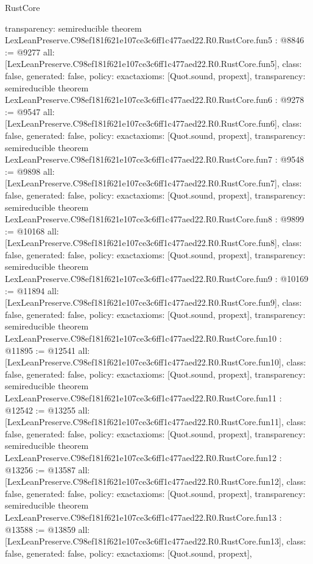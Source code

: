 \begin{lexlean}{RustCore}
\begin{coremodule}
{  transparency: semireducible
}
theorem LexLeanPreserve.C98ef181f621e107ce3c6ff1c477aed22.R0.RustCore.fun5 : @8846 := @9277 {
  all: [LexLeanPreserve.C98ef181f621e107ce3c6ff1c477aed22.R0.RustCore.fun5],
  class: false,
  generated: false,
  policy: exact{axioms: [Quot.sound, propext]},
  transparency: semireducible
}
theorem LexLeanPreserve.C98ef181f621e107ce3c6ff1c477aed22.R0.RustCore.fun6 : @9278 := @9547 {
  all: [LexLeanPreserve.C98ef181f621e107ce3c6ff1c477aed22.R0.RustCore.fun6],
  class: false,
  generated: false,
  policy: exact{axioms: [Quot.sound, propext]},
  transparency: semireducible
}
theorem LexLeanPreserve.C98ef181f621e107ce3c6ff1c477aed22.R0.RustCore.fun7 : @9548 := @9898 {
  all: [LexLeanPreserve.C98ef181f621e107ce3c6ff1c477aed22.R0.RustCore.fun7],
  class: false,
  generated: false,
  policy: exact{axioms: [Quot.sound, propext]},
  transparency: semireducible
}
theorem LexLeanPreserve.C98ef181f621e107ce3c6ff1c477aed22.R0.RustCore.fun8 : @9899 := @10168 {
  all: [LexLeanPreserve.C98ef181f621e107ce3c6ff1c477aed22.R0.RustCore.fun8],
  class: false,
  generated: false,
  policy: exact{axioms: [Quot.sound, propext]},
  transparency: semireducible
}
theorem LexLeanPreserve.C98ef181f621e107ce3c6ff1c477aed22.R0.RustCore.fun9 : @10169 := @11894 {
  all: [LexLeanPreserve.C98ef181f621e107ce3c6ff1c477aed22.R0.RustCore.fun9],
  class: false,
  generated: false,
  policy: exact{axioms: [Quot.sound, propext]},
  transparency: semireducible
}
theorem LexLeanPreserve.C98ef181f621e107ce3c6ff1c477aed22.R0.RustCore.fun10 : @11895 := @12541 {
  all: [LexLeanPreserve.C98ef181f621e107ce3c6ff1c477aed22.R0.RustCore.fun10],
  class: false,
  generated: false,
  policy: exact{axioms: [Quot.sound, propext]},
  transparency: semireducible
}
theorem LexLeanPreserve.C98ef181f621e107ce3c6ff1c477aed22.R0.RustCore.fun11 : @12542 := @13255 {
  all: [LexLeanPreserve.C98ef181f621e107ce3c6ff1c477aed22.R0.RustCore.fun11],
  class: false,
  generated: false,
  policy: exact{axioms: [Quot.sound, propext]},
  transparency: semireducible
}
theorem LexLeanPreserve.C98ef181f621e107ce3c6ff1c477aed22.R0.RustCore.fun12 : @13256 := @13587 {
  all: [LexLeanPreserve.C98ef181f621e107ce3c6ff1c477aed22.R0.RustCore.fun12],
  class: false,
  generated: false,
  policy: exact{axioms: [Quot.sound, propext]},
  transparency: semireducible
}
theorem LexLeanPreserve.C98ef181f621e107ce3c6ff1c477aed22.R0.RustCore.fun13 : @13588 := @13859 {
  all: [LexLeanPreserve.C98ef181f621e107ce3c6ff1c477aed22.R0.RustCore.fun13],
  class: false,
  generated: false,
  policy: exact{axioms: [Quot.sound, propext]},
}
\end{coremodule}
\end{lexlean}
